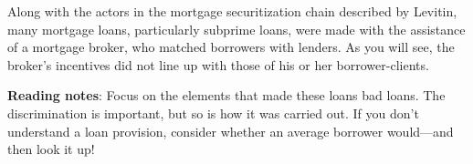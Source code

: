 

Along with the actors in the mortgage securitization chain described by Levitin,
many mortgage loans, particularly subprime loans, were made with the assistance
of a mortgage broker, who matched borrowers with lenders.  As you will see, the
broker's incentives did not line up with those of his or her borrower-clients.

\textbf{Reading notes}: Focus on the elements that made these loans bad loans. 
The discrimination is important, but so is how it was carried out.  If you
don't understand a loan provision, consider whether an average borrower
would---and then look it up!

